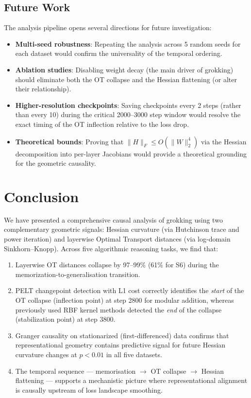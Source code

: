 \documentclass[12pt,twoside]{article}
\begin{document}
\subsection{Future Work}

The analysis pipeline opens several directions for future investigation:

\begin{itemize}
  \item \textbf{Multi-seed robustness}: Repeating the analysis across 5
    random seeds for each dataset would confirm the universality of the
    temporal ordering.
  \item \textbf{Ablation studies}: Disabling weight decay (the main driver
    of grokking) should eliminate both the OT collapse and the Hessian
    flattening (or alter their relationship).
  \item \textbf{Higher-resolution checkpoints}: Saving checkpoints every 2
    steps (rather than every 10) during the critical 2000--3000 step window
    would resolve the exact timing of the OT inflection relative to the loss
    drop.
  \item \textbf{Theoretical bounds}: Proving that \(\|H\|_F \leq
    O(\|W\|_2^4)\) via the Hessian decomposition into per-layer Jacobians
    would provide a theoretical grounding for the geometric causality.
\end{itemize}

\section{Conclusion}
\label{sec:conclusion}

We have presented a comprehensive causal analysis of grokking using two
complementary geometric signals: Hessian curvature (via Hutchinson trace
and power iteration) and layerwise Optimal Transport distances (via
log-domain Sinkhorn--Knopp). Across five algorithmic reasoning tasks, we
find that:

\begin{enumerate}
  \item Layerwise OT distances collapse by 97--99\% (61\% for S6) during
    the memorization-to-generalisation transition.
  \item PELT changepoint detection with L1 cost correctly identifies the
    \emph{start} of the OT collapse (inflection point) at step 2800 for
    modular addition, whereas previously used RBF kernel methods detected
    the \emph{end} of the collapse (stabilization point) at step 3800.
  \item Granger causality on stationarized (first-differenced) data confirms
    that representational geometry contains predictive signal for future
    Hessian curvature changes at $p < 0.01$ in all five datasets.
  \item The temporal sequence --- memorisation $\to$ OT collapse $\to$
    Hessian flattening --- supports a mechanistic picture where
    representational alignment is causally upstream of loss landscape
    smoothing.
\end{enumerate}
\end{document}

